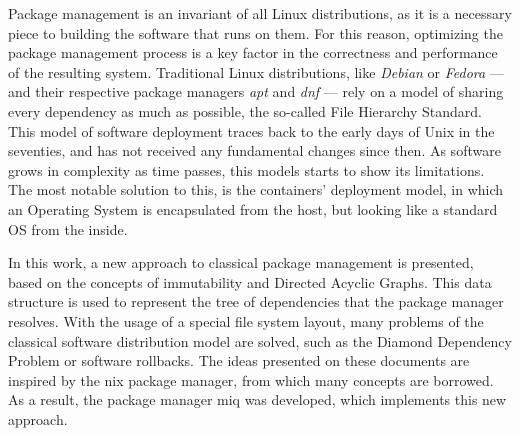 Package management is an invariant of all Linux distributions, as it is a
necessary piece to building the software that runs on them. For this reason,
optimizing the package management process is a key factor in the correctness and
performance of the resulting system. Traditional Linux distributions, like
\textit{Debian} or \textit{Fedora} --- and their respective
package managers \textit{apt} and \textit{dnf} --- rely on a
model of sharing every dependency as much as possible, the so-called File
Hierarchy Standard. This model of software
deployment traces back to the early days of Unix in the seventies, and has not
received any fundamental changes since then. As software grows in complexity as
time passes, this models starts to show its limitations. The most notable
solution to this, is the containers' deployment model, in which an Operating
System is encapsulated from the host, but looking like a standard OS from the inside.


In this work, a new approach to classical package
management is presented, based on the concepts of immutability and
Directed Acyclic Graphs. This data structure is used to represent the tree of dependencies
that the package manager resolves. With the usage of a
special file system
layout, many problems of the classical software distribution model are solved,
such as the Diamond Dependency Problem or software rollbacks.
The ideas presented on these documents are inspired by the nix package manager,
from which many concepts are borrowed. As a result, the package manager miq was
developed, which implements this new approach.
